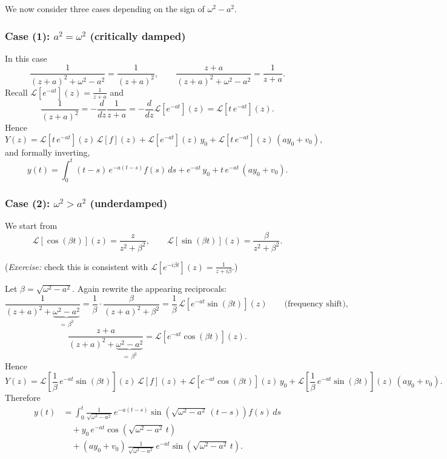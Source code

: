 We now consider three cases depending on the sign of $\omega^2 - a^2$.

\subsubsection*{Case (1): $a^2 = \omega^2$ (critically damped)}

In this case
\[
\frac{1}{(z+a)^2 + \omega^2 - a^2} = \frac{1}{(z+a)^2}, \qquad
\frac{z+a}{(z+a)^2 + \omega^2 - a^2} = \frac{1}{z+a}.
\]
Recall $\mathcal{L}[e^{-at}](z) = \tfrac{1}{z+a}$ and
\[
\frac{1}{(z+a)^2} = -\frac{d}{dz}\frac{1}{z+a} = -\frac{d}{dz}\mathcal{L}[e^{-at}](z) = \mathcal{L}[t\,e^{-at}](z).
\]
Hence
\[
Y(z) = \mathcal{L}[t\,e^{-at}](z)\,\mathcal{L}[f](z) + \mathcal{L}[e^{-at}](z)\,y_0 + \mathcal{L}[t\,e^{-at}](z)\,(a y_0 + v_0),
\]
and formally inverting,
\[
\boxed{y(t) = \int_0^t (t - s)\,e^{-a(t-s)} f(s)\,ds + e^{-at}\,y_0 + t\,e^{-at}\,(a y_0 + v_0).}
\]

\subsubsection*{Case (2): $\omega^2 > a^2$ (underdamped)}

We start from
\[
\boxed{\mathcal{L}[\cos(\beta t)](z) = \frac{z}{z^2 + \beta^2}, \qquad
\mathcal{L}[\sin(\beta t)](z) = \frac{\beta}{z^2 + \beta^2}.}
\]

(\textit{Exercise:} check this is consistent with $\mathcal{L}[e^{-i\beta t}](z) = \tfrac{1}{z + i\beta}$.)

Let $\beta = \sqrt{\omega^2 - a^2}$. Again rewrite the appearing reciprocals:
\[
\frac{1}{(z+a)^2 + \underbrace{\omega^2 - a^2}_{=\,\beta^2}}
= \frac{1}{\beta} \cdot \frac{\beta}{(z+a)^2 + \beta^2}
= \frac{1}{\beta}\,\mathcal{L}[e^{-at}\sin(\beta t)](z) \qquad \text{(frequency shift),}
\]
\[
\frac{z + a}{(z+a)^2 + \underbrace{\omega^2 - a^2}_{=\,\beta^2}}
= \mathcal{L}[e^{-at}\cos(\beta t)](z).
\]
Hence
\[
Y(z) = \mathcal{L}\!\left[\frac{1}{\beta}\,e^{-at}\sin(\beta t)\right](z)\,\mathcal{L}[f](z)
+ \mathcal{L}[e^{-at}\cos(\beta t)](z)\,y_0
+ \mathcal{L}\!\left[\frac{1}{\beta}\,e^{-at}\sin(\beta t)\right](z)\,(a y_0 + v_0).
\]
Therefore
\[
\boxed{
\begin{aligned}
y(t) &= \int_0^t \frac{1}{\sqrt{\omega^2 - a^2}}\,e^{-a(t-s)}\sin\!\left(\sqrt{\omega^2 - a^2}\,(t - s)\right) f(s)\,ds \\
&\quad + y_0\,e^{-at}\cos\!\left(\sqrt{\omega^2 - a^2}\,t\right) \\
&\quad + (a y_0 + v_0)\,\frac{1}{\sqrt{\omega^2 - a^2}}\,e^{-at}\sin\!\left(\sqrt{\omega^2 - a^2}\,t\right).
\end{aligned}}
\]

